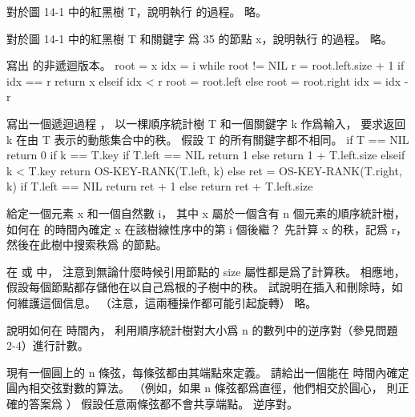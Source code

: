\startsection[
  title={Dynamic order statistics},
]

\startEXERCISE
對於圖 14-1 中的紅黑樹 T，說明執行  的過程。
\stopEXERCISE
\startANSWER
略。
\stopANSWER

\startEXERCISE
對於圖 14-1 中的紅黑樹 T 和關鍵字  爲 35 的節點 x，說明執行  的過程。
\stopEXERCISE
\startANSWER
略。
\stopANSWER

\startEXERCISE
寫出  的非遞迴版本。
\stopEXERCISE
\startANSWER
{}
\startCLRS
root = x
idx = i
while root != NIL
	r = root.left.size + 1
	if idx == r
		return x
	elseif idx < r
		root = root.left
	else
		root = root.right
		idx = idx - r
\stopCLRS
\stopANSWER

\startEXERCISE
寫出一個遞迴過程 ，
以一棵順序統計樹 T 和一個關鍵字 k 作爲輸入，
要求返回 k 在由 T 表示的動態集合中的秩。
假設 T 的所有關鍵字都不相同。
\stopEXERCISE
\startANSWER
{}
\startCLRS
if T == NIL
	return 0
if k == T.key
	if T.left == NIL
		return 1
	else
		return 1 + T.left.size
elseif k < T.key
	return OS-KEY-RANK(T.left, k)
else
	ret = OS-KEY-RANK(T.right, k)
	if T.left == NIL
		return ret + 1
	else
		return ret + T.left.size
\stopCLRS
\stopANSWER

\startEXERCISE
給定一個元素 x 和一個自然數 i，
其中 x 屬於一個含有 n 個元素的順序統計樹，
如何在  的時間內確定 x 在該樹線性序中的第 i 個後繼？
\stopEXERCISE
\startANSWER
先計算 x 的秩，記爲 r，然後在此樹中搜索秩爲  的節點。
\stopANSWER

\startEXERCISE
在  或  中，
注意到無論什麼時候引用節點的 size 屬性都是爲了計算秩。
相應地，假設每個節點都存儲他在以自己爲根的子樹中的秩。
試說明在插入和刪除時，如何維護這個信息。
（注意，這兩種操作都可能引起旋轉）
\stopEXERCISE
\startANSWER
略。
\stopANSWER

\startEXERCISE
說明如何在  時間內，
利用順序統計樹對大小爲 n 的數列中的逆序對（參見問題 2-4）進行計數。
\stopEXERCISE
\startANSWER
\TODO{}
\stopANSWER

\startEXERCISE
現有一個圓上的 n 條弦，每條弦都由其端點來定義。
請給出一個能在  時間內確定圓內相交弦對數的算法。
（例如，如果 n 條弦都爲直徑，他們相交於圓心，
則正確的答案爲 ）
假設任意兩條弦都不會共享端點。
\stopEXERCISE
\startANSWER
\hint 逆序對。
\stopANSWER

\stopsection
